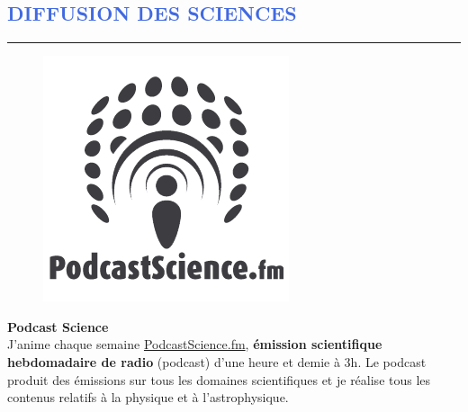 \documentclass[11pt,a4paper, french]{article}
\begin{document}
\vspace{-0.3cm}
\textcolor{RoyalBlue}{\section{\large DIFFUSION DES SCIENCES}
\vspace{-0.2cm}\hrule}
\vspace{0.4cm}
\begin{figure}
\vspace{-0.8cm}
\begin{mybox}
    \includegraphics[width=1.\textwidth]{figures_CV/PodcastScience.png}
 \end{mybox}
\vspace{-0.8cm}
\end{figure}
\textbf{Podcast Science} \\
\vspace{-0cm}
\hspace{0.3cm}
J'anime chaque semaine \href{http://www.podcastscience.fm}{PodcastScience.fm},
\textbf{émission scientifique hebdomadaire de radio} (podcast) d'une heure et demie à
3h. Le podcast produit des émissions sur tous les domaines scientifiques et je réalise tous les contenus
relatifs à la physique et à l'astrophysique.
\end{document}
